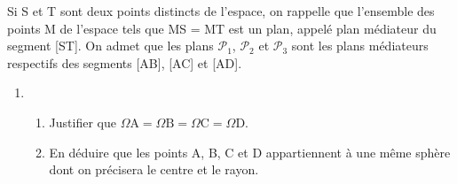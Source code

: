 \documentclass[11pt,a4paper,french]{article}
\begin{document}
Si S et T sont deux points distincts de l'espace, on rappelle que l'ensemble des points M de l'espace tels que MS = MT est un plan, appelé plan médiateur du segment [ST]. On admet que les plans $\mathcal{P}_1$,\: $\mathcal{P}_2$ et $\mathcal{P}_3$ sont les plans médiateurs respectifs des
segments [AB], [AC] et [AD].

\begin{enumerate}[resume]
\item
	\begin{enumerate}
		\item Justifier que $\Omega \text{A} = \Omega \text{B} = \Omega \text{C} = \Omega \text{D}$.
		\item En déduire que les points A, B, C et D appartiennent à une même sphère dont
on précisera le centre et le rayon.
	\end{enumerate}
\end{enumerate}
\end{document}
